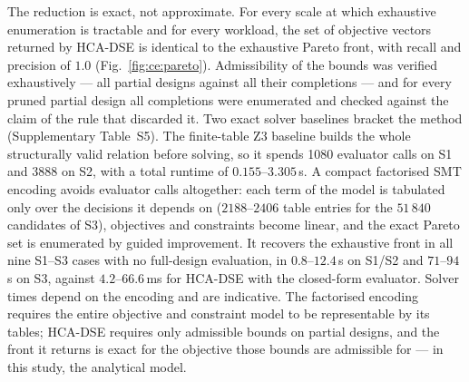 \documentclass[pdflatex,sn-nature,lineno]{sn-jnl}
\newcommand{\RefSolverTab}{Supplementary Table~S5}
\begin{document}
The reduction is exact, not approximate. For every scale at which exhaustive enumeration
is tractable and for every workload, the set of objective vectors returned by HCA-DSE is
identical to the exhaustive Pareto front, with recall and precision of $1.0$
(Fig.~\ref{fig:ce:pareto}). Admissibility of the bounds was verified exhaustively --- all
partial designs against all their completions --- and for every pruned partial design all
completions were enumerated and checked against the claim of the rule that discarded it.
%
Two exact solver baselines bracket the method (\RefSolverTab{}). The finite-table Z3 baseline builds the whole structurally valid relation before solving, so it spends 1080 evaluator calls on S1 and 3888 on S2, with a total runtime of $0.155\text{--}3.305$\,s. A compact factorised SMT encoding avoids evaluator calls altogether: each term of the model is tabulated only over the decisions it depends on ($2188\text{--}2406$ table entries for the $51\,840$ candidates of S3), objectives and constraints become linear, and the exact Pareto set is enumerated by guided improvement. It recovers the exhaustive front in all nine S1--S3 cases with no full-design evaluation, in $0.8\text{--}12.4$\,s on S1/S2 and $71\text{--}94$\,s on S3, against $4.2\text{--}66.6$\,ms for HCA-DSE with the closed-form evaluator. Solver times depend on the encoding and are indicative. The factorised encoding requires the entire objective and constraint model to be representable by its tables; HCA-DSE requires only admissible bounds on partial designs, and the front it returns is exact for the objective those bounds are admissible for --- in this study, the analytical model.
\end{document}

